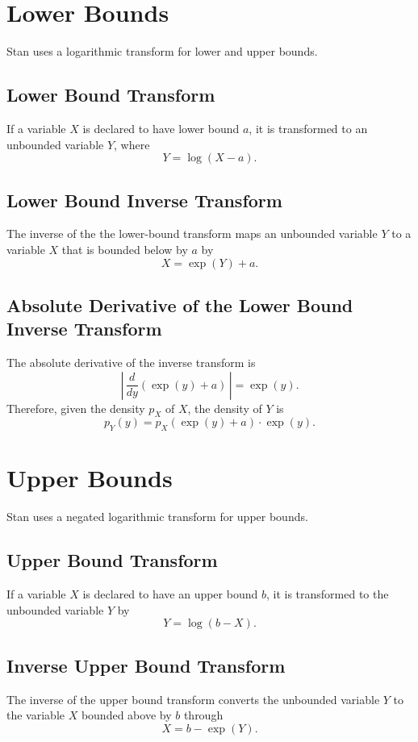 \documentclass[10pt]{report}
\newcommand{\Stan}{Stan\xspace}
\begin{document}
\section{Lower Bounds}

\Stan uses a logarithmic transform for lower and upper bounds.  

\subsection{Lower Bound Transform}

If a variable $X$ is declared to have lower bound $a$, it is
transformed to an unbounded variable $Y$, where
%
\[
Y = \log(X - a).
\]

\subsection{Lower Bound Inverse Transform}
%
The inverse of the the lower-bound transform maps an unbounded
variable $Y$ to a variable $X$ that is bounded below by $a$ by
%
\[
X = \exp(Y) + a.
\]

\subsection{Absolute Derivative of the Lower Bound Inverse Transform}

The absolute derivative of the inverse transform is
\[
\left| \,
\frac{d}{dy} \left( \exp(y) + a \right)
\, \right|
= \exp(y).
\]
Therefore, given the density $p_X$ of $X$, the density of $Y$ is 
%
\[
p_Y(y) 
= p_X\!\left( \exp(y) + a \right) \cdot \exp(y).
\]


\section{Upper Bounds}

\Stan uses a negated logarithmic transform for upper bounds.

\subsection{Upper Bound Transform}

If a variable $X$ is declared to have an upper bound $b$, it is
transformed to the unbounded variable $Y$ by
%
\[
Y = \log(b - X).
\]

\subsection{Inverse Upper Bound Transform}
%
The inverse of the upper bound transform converts the unbounded
variable $Y$ to the variable $X$ bounded above by $b$ through
%
\[
X = b - \exp(Y).
\]
\end{document}

